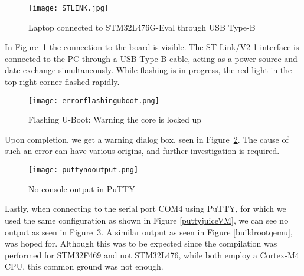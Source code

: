 \begin{figure}[H]
\centering
\texttt{[image: STLINK.jpg]}
\caption{Laptop connected to STM32L476G-Eval through USB Type-B}
\label{usbB}
\end{figure}

In Figure~\ref{usbB} the connection to the board is visible. The ST-Link/V2-1 interface is connected to the PC through a USB Type-B cable, acting as a power source and date exchange simultaneously. While flashing is in progress, the red light in the top right corner flashed rapidly.

\begin{figure}[H]
\centering
\texttt{[image: errorflashinguboot.png]}
\caption{Flashing U-Boot: Warning the core is locked up}
\label{errorflashinguboot}
\end{figure}

Upon completion, we get a warning dialog box, seen in Figure~\ref{errorflashinguboot}. The cause of such an error can have various origins, and further investigation is required.

\begin{figure}[H]
\centering
\texttt{[image: puttynooutput.png]}
\caption{No console output in PuTTY}
\label{puttynooutput}
\end{figure}

Lastly, when connecting to the serial port COM4 using PuTTY, for which we used the same configuration as shown in Figure \ref{puttyjuiceVM}, we can see no output as seen in Figure~\ref{puttynooutput}. A similar output as seen in Figure \ref{buildrootqemu}, was hoped for. Although this was to be expected since the compilation was performed for STM32F469 and not STM32L476, while both employ a Cortex-M4 CPU, this common ground was not enough.
